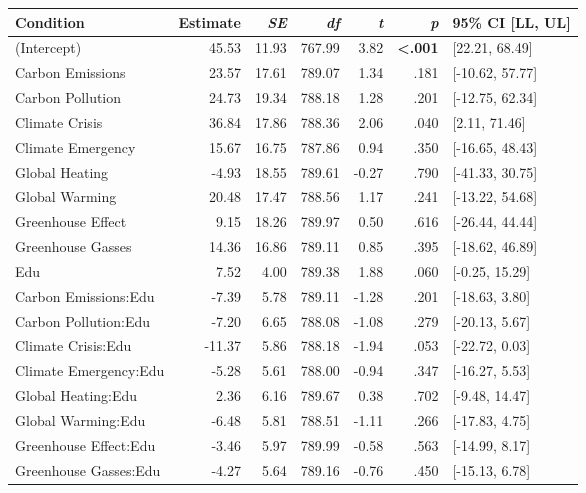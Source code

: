 \begin{table}[ht]
\centering
\begin{tabular}{lrrrrrl}
  \hline
Condition & Estimate & \textit{SE} & \textit{df} & \textit{t} & \textit{p} & 95\% CI [LL, UL] \\ 
  \hline
(Intercept) & 45.53 & 11.93 & 767.99 & 3.82 & \textbf{\textless  .001} & [22.21, 68.49] \\ 
  Carbon Emissions & 23.57 & 17.61 & 789.07 & 1.34 & .181 & [-10.62, 57.77] \\ 
  Carbon Pollution & 24.73 & 19.34 & 788.18 & 1.28 & .201 & [-12.75, 62.34] \\ 
  Climate Crisis & 36.84 & 17.86 & 788.36 & 2.06 & .040 & [2.11, 71.46] \\ 
  Climate Emergency & 15.67 & 16.75 & 787.86 & 0.94 & .350 & [-16.65, 48.43] \\ 
  Global Heating & -4.93 & 18.55 & 789.61 & -0.27 & .790 & [-41.33, 30.75] \\ 
  Global Warming & 20.48 & 17.47 & 788.56 & 1.17 & .241 & [-13.22, 54.68] \\ 
  Greenhouse Effect & 9.15 & 18.26 & 789.97 & 0.50 & .616 & [-26.44, 44.44] \\ 
  Greenhouse Gasses & 14.36 & 16.86 & 789.11 & 0.85 & .395 & [-18.62, 46.89] \\ 
  Edu & 7.52 & 4.00 & 789.38 & 1.88 & .060 & [-0.25, 15.29] \\ 
  Carbon Emissions:Edu & -7.39 & 5.78 & 789.11 & -1.28 & .201 & [-18.63, 3.80] \\ 
  Carbon Pollution:Edu & -7.20 & 6.65 & 788.08 & -1.08 & .279 & [-20.13, 5.67] \\ 
  Climate Crisis:Edu & -11.37 & 5.86 & 788.18 & -1.94 & .053 & [-22.72, 0.03] \\ 
  Climate Emergency:Edu & -5.28 & 5.61 & 788.00 & -0.94 & .347 & [-16.27, 5.53] \\ 
  Global Heating:Edu & 2.36 & 6.16 & 789.67 & 0.38 & .702 & [-9.48, 14.47] \\ 
  Global Warming:Edu & -6.48 & 5.81 & 788.51 & -1.11 & .266 & [-17.83, 4.75] \\ 
  Greenhouse Effect:Edu & -3.46 & 5.97 & 789.99 & -0.58 & .563 & [-14.99, 8.17] \\ 
  Greenhouse Gasses:Edu & -4.27 & 5.64 & 789.16 & -0.76 & .450 & [-15.13, 6.78] \\ 
   \hline
\end{tabular}
\end{table}
